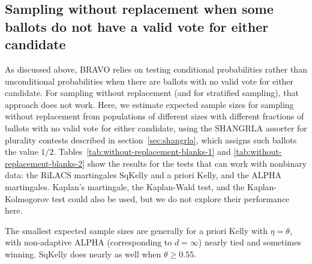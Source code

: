 \documentclass[12pt,runningheads]{llncs}
\begin{document}
{\subsection{Sampling without replacement when some ballots do not have a valid vote for either candidate}
As discussed above, BRAVO relies on testing conditional probabilities
rather than unconditional probabilities when there are ballots with no valid vote for either candidate.
For sampling without replacement (and for stratified sampling), that approach does not work.
Here, we estimate expected sample sizes for sampling without replacement from populations of different sizes
with different fractions of ballots with no valid vote for either candidate, using the SHANGRLA assorter for plurality
contests described in section~\ref{sec:shangrla}, which assigns such ballots the value $1/2$.
Tables~\ref{tab:without-replacement-blanks-1} and \ref{tab:without-replacement-blanks-2} show the
 results for the tests that can work with nonbinary data:
the RiLACS martingales SqKelly and a priori Kelly, and the ALPHA martingales. 
Kaplan's martingale, the Kaplan-Wald test, and the Kaplan-Kolmogorov test \cite{stark09b,stark20} could also be used, but we do not explore their performance here.

The smallest expected sample sizes are generally for a priori Kelly with $\eta=\theta$, with non-adaptive ALPHA (corresponding to
$d=\infty$) nearly tied and sometimes winning.
SqKelly does nearly as well when $\theta \ge 0.55$.

}
\end{document}
